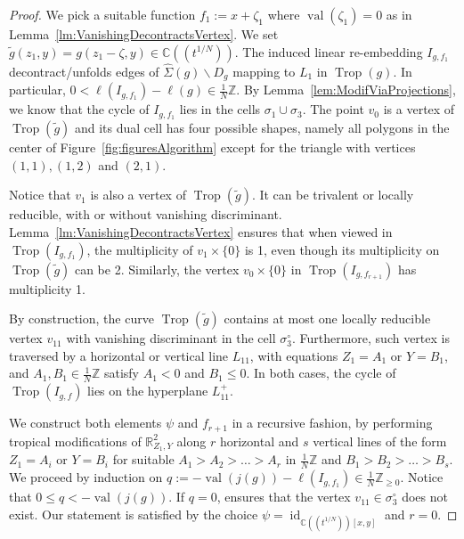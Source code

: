 \documentclass[11pt]{amsart}
\numberwithin{equation}{section}
\theoremstyle{plain}
\theoremstyle{definition}
\theoremstyle{remark}
\begin{document}
\begin{proof}   
  We pick a suitable function $f_1:=x+{\zeta}_1$ where $\operatorname{val}({\zeta}_1)=0$ 
as
  in Lemma~\ref{lm:VanishingDecontractsVertex}. We set
  $\tilde{g}(z_1,y)=g(z_1-{\zeta},y)\in {{\mathbb{C}}(\!(t^{1/N})\!)}$.  The induced linear
  re-embedding $I_{g,f_1}$ decontract/unfolds edges of
  $\widehat{\Sigma}(g)\smallsetminus D_g$ mapping to $L_1$ in
  $\operatorname{Trop}(g)$. In particular, $0<\ell(I_{g,f_1})-\ell(g)\in
  \frac{1}{N}{\mathbb{Z}}$.  By Lemma~\ref{lem:ModifViaProjections}, we know
  that the cycle of $I_{g,f_1}$ lies in the cells $\sigma_1\cup
  \sigma_3$. The point $v_0$ is a vertex of $\operatorname{Trop}(\tilde{g})$ and its
  dual cell has four possible shapes, namely all polygons in the
  center of Figure~\ref{fig:figuresAlgorithm} except for the triangle
  with vertices $(1,1), (1,2)$ and $(2,1)$. 

  Notice that $v_1$ is also a vertex of $\operatorname{Trop}(\tilde{g})$. It can be
  trivalent or locally reducible, with or without vanishing
  discriminant. Lemma~\ref{lm:VanishingDecontractsVertex} ensures that
  when viewed in $\operatorname{Trop}(I_{g,f_1})$, the multiplicity of $v_1\times
  \{0\}$ is 1, even though its multiplicity on $\operatorname{Trop}(\tilde{g})$ can
  be 2. Similarly, the vertex $v_0\times \{0\}$ in
  $\operatorname{Trop}(I_{g,f_{r+1}})$ has multiplicity 1.

  By construction, the curve $\operatorname{Trop}(\tilde{g})$ contains at most one
  locally reducible vertex $v_{11}$ with vanishing discriminant in the
  cell $\sigma_3^{\circ}$. Furthermore, such vertex is traversed by a
  horizontal or vertical line $L_{11}$, with equations $Z_1=A_1$ or
  $Y=B_1$, and $A_1,B_1 \in \frac{1}{N}{\mathbb{Z}}$ satisfy $A_1<0$ and
  $B_1\leq 0$. In both cases, the cycle of $\operatorname{Trop}(I_{g,f})$ lies on
  the hyperplane $L_{11}^+$.

  We construct both elements $\psi$ and $f_{r+1}$ in a recursive
  fashion, by performing tropical modifications of ${\mathbb{R}}^2_{Z_1,Y}$
  along $r$ horizontal and $s$ vertical lines of the form $Z_1=A_i$ or
  $Y=B_i$ for suitable $A_1>A_2>\ldots>A_r$ in $\frac{1}{N}{\mathbb{Z}}$ and
  $B_1>B_2>\ldots>B_s$.  We proceed by induction on
  $q:=-\operatorname{val}(j(g))-\ell(I_{g,f_1}) \in \frac{1}{N}{\mathbb{Z}}_{\geq 0}$.
  Notice that $0\leq q<-\operatorname{val}(j(g))$.  If $q=0$, \cite[Theorem
  11]{KMM07} ensures that the vertex $v_{11}\in \sigma_3^{\circ}$ does
  not exist. Our statement is satisfied by the choice
  $\psi=\operatorname{id}_{{{\mathbb{C}}(\!(t^{1/N})\!)}[x,y]}$ and $r=0$.


\end{proof}
\end{document}
